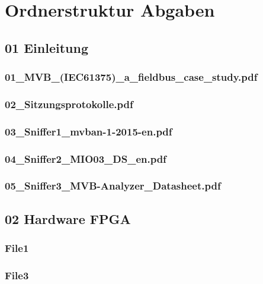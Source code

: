 

\chapter{Ordnerstruktur Abgaben} %
\label{ApendixB} %

\section{01 Einleitung}
\label{app:Odner1}
\subsection{01\_MVB\_(IEC61375)\_a\_fieldbus\_case\_study.pdf}
\label{app:File11}
\subsection{02\_Sitzungsprotokolle.pdf}
\label{app:File12}
\subsection{03\_Sniffer1\_mvban-1-2015-en.pdf}
\label{app:File13}
\subsection{04\_Sniffer2\_MIO03\_DS\_en.pdf}
\label{app:File14}
\subsection{05\_Sniffer3\_MVB-Analyzer\_Datasheet.pdf}
\label{app:File15}

\section{02 Hardware FPGA}
\label{app:Odner3}
\subsection{File1}
\label{app:File31}
\subsection{File3}
\label{app:File32}

